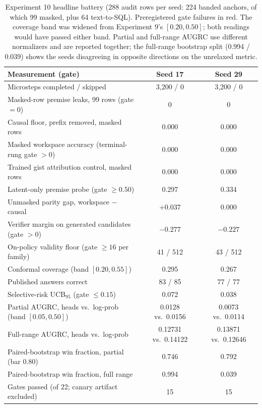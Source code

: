 \documentclass[10pt,a4paper]{article}
\newcommand{\fail}[1]{\textcolor{failred}{#1}}
\begin{document}
\begin{table}[htbp]
\caption{Experiment 10 headline battery (288 audit rows per seed: 224 banded anchors, of which 99 masked, plus 64 text-to-SQL). Preregistered gate failures in red. The coverage band was widened from Experiment 9's $[0.20, 0.50]$; both readings would have passed either band. Partial and full-range AUGRC use different normalizers and are reported together; the full-range bootstrap split (0.994 / 0.039) shows the seeds disagreeing in opposite directions on the unrelaxed metric.}
\label{tab:study10-new}
\centering\footnotesize
\begin{tabularx}{\textwidth}{@{}Xcc@{}}
\toprule
Measurement (gate) & Seed 17 & Seed 29 \\
\midrule
Microsteps completed / skipped & 3,200 / 0 & 3,200 / 0 \\
Masked-row premise leaks, 99 rows (gate $=0$) & 0 & 0 \\
Causal floor, prefix removed, masked rows & 0.000 & 0.000 \\
Masked workspace accuracy (terminal-rung gate $>0$) & \fail{0.000} & \fail{0.000} \\
Trained gist attribution control, masked rows & 0.000 & 0.000 \\
Latent-only premise probe (gate $\geq 0.50$) & \fail{0.297} & \fail{0.334} \\
Unmasked parity gap, workspace $-$ causal & $+0.037$ & 0.000 \\
Verifier margin on generated candidates (gate $>0$) & \fail{$-0.277$} & \fail{$-0.227$} \\
On-policy validity floor (gate $\geq 16$ per family) & \fail{41 / 512} & \fail{43 / 512} \\
Conformal coverage (band $[0.20, 0.55]$) & 0.295 & 0.267 \\
Published answers correct & 83 / 85 & 77 / 77 \\
Selective-risk UCB$_{95}$ (gate $\leq 0.15$) & 0.072 & 0.038 \\
Partial AUGRC, heads vs.\ log-prob (band $[0.05, 0.50]$) & 0.0128 vs.\ 0.0156 & 0.0073 vs.\ 0.0114 \\
Full-range AUGRC, heads vs.\ log-prob & 0.12731 vs.\ 0.14122 & 0.13871 vs.\ 0.12646 \\
Paired-bootstrap win fraction, partial (bar 0.80) & \fail{0.746} & \fail{0.792} \\
Paired-bootstrap win fraction, full range & 0.994 & 0.039 \\
Gates passed (of 22; canary artifact excluded) & 15 & 15 \\
\bottomrule
\end{tabularx}
\end{table}
\end{document}

